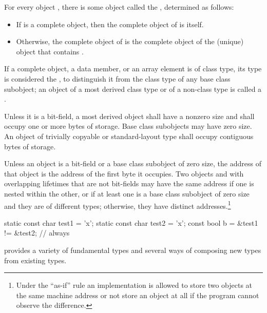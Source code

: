 \pnum
For every object , there is some object called the
 , determined as follows:
\begin{itemize}
\item
If  is a complete object, then the complete object
of  is itself.

\item
Otherwise, the complete object of  is the complete object
of the (unique) object that contains .
\end{itemize}

\pnum
If a complete object, a data member, or an array element is of
class type, its type is considered the , to distinguish it from the class type of any base class subobject;
an object of a most derived class type or of a non-class type is called a
.

\pnum
{}%
Unless it is a bit-field, a most derived object shall have a
nonzero size and shall occupy one or more bytes of storage. Base class
subobjects may have zero size. An object of trivially copyable or
standard-layout type shall occupy contiguous bytes of
storage.

\pnum
{}%
%
Unless an object is a bit-field or a base class subobject of zero size, the
address of that object is the address of the first byte it occupies.
Two objects  and 
with overlapping lifetimes
that are not bit-fields
may have the same address
if one is nested within the other,
or
if at least one is a base class subobject of zero size
and they are of different types;
otherwise, they have distinct addresses.\footnote{Under the ``as-if'' rule an
implementation is allowed to store two objects at the same machine address or
not store an object at all if the program cannot observe the
difference.}

\begin{example}
\begin{codeblock}
static const char test1 = 'x';
static const char test2 = 'x';
const bool b = &test1 != &test2;      // always 
\end{codeblock}
\end{example}

\pnum
\begin{note}
\Cpp  provides a variety of fundamental types and several ways of composing
new types from existing types.
\end{note}%


